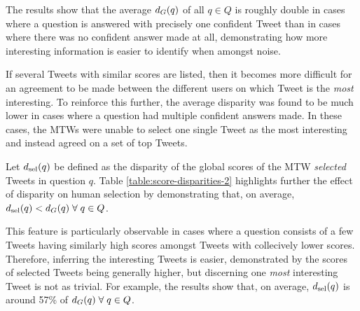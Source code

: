 The results show that the average $d_G(q)$ of all $q \in Q$ is roughly double in cases where a question is answered with precisely one confident Tweet than in cases where there was no confident answer made at all, demonstrating how more interesting information is easier to identify when amongst noise. 

If several Tweets with similar scores are listed, then it becomes more difficult for an agreement to be made between the different users on which Tweet is the \textit{most} interesting. To reinforce this further, the average disparity was found to be much lower in cases where a question had multiple confident answers made. In these cases, the MTWs were unable to select one single Tweet as the most interesting and instead agreed on a set of top Tweets.


Let $d_{\textrm{sel}}(q)$ be defined as the disparity of the global scores of the MTW \textit{selected} Tweets in question $q$. Table \ref{table:score-disparities-2} highlights further the effect of disparity on human selection by demonstrating that, on average, $d_{\textrm{sel}}(q) < d_G(q) \; \forall \; q \in Q$. 


This feature is particularly observable in cases where a question consists of a few Tweets having similarly high scores amongst Tweets with collecively lower scores. Therefore, inferring the interesting Tweets is easier, demonstrated by the scores of selected Tweets being generally higher, but discerning one \textit{most} interesting Tweet is not as trivial. For example, the results show that, on average, $d_{\textrm{sel}}(q)$ is around 57\% of $d_G(q) \; \forall \; q \in Q$.

